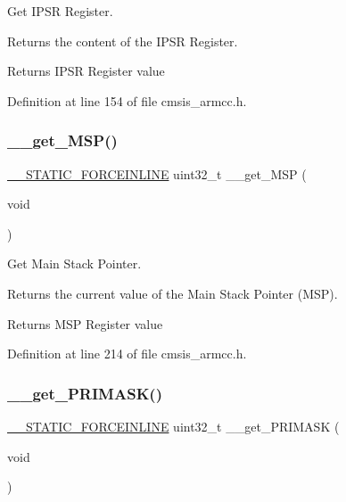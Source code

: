 Get I\+P\+SR Register. 

Returns the content of the I\+P\+SR Register. \begin{DoxyReturn}{Returns}
I\+P\+SR Register value 
\end{DoxyReturn}


Definition at line 154 of file cmsis\+\_\+armcc.\+h.

\mbox{\label{group___c_m_s_i_s___core___reg_acc_functions_ga667e7b8b97b4a30f445ae45d37588e45}} 
\subsubsection{\texorpdfstring{\+\_\+\+\_\+get\+\_\+\+M\+S\+P()}{\_\_get\_MSP()}}
{\footnotesize\ttfamily \hyperlink{cmsis__iccarm_8h_ab904513442afdf77d4f8c74f23cbb040}{\+\_\+\+\_\+\+S\+T\+A\+T\+I\+C\+\_\+\+F\+O\+R\+C\+E\+I\+N\+L\+I\+NE} uint32\+\_\+t \+\_\+\+\_\+get\+\_\+\+M\+SP (\begin{DoxyParamCaption}\item[{void}]{ }\end{DoxyParamCaption})}



Get Main Stack Pointer. 

Returns the current value of the Main Stack Pointer (M\+SP). \begin{DoxyReturn}{Returns}
M\+SP Register value 
\end{DoxyReturn}


Definition at line 214 of file cmsis\+\_\+armcc.\+h.

\mbox{\label{group___c_m_s_i_s___core___reg_acc_functions_ga4ff59fb9e280d19e79e6875863a65f0a}} 
\subsubsection{\texorpdfstring{\+\_\+\+\_\+get\+\_\+\+P\+R\+I\+M\+A\+S\+K()}{\_\_get\_PRIMASK()}}
{\footnotesize\ttfamily \hyperlink{cmsis__iccarm_8h_ab904513442afdf77d4f8c74f23cbb040}{\+\_\+\+\_\+\+S\+T\+A\+T\+I\+C\+\_\+\+F\+O\+R\+C\+E\+I\+N\+L\+I\+NE} uint32\+\_\+t \+\_\+\+\_\+get\+\_\+\+P\+R\+I\+M\+A\+SK (\begin{DoxyParamCaption}\item[{void}]{ }\end{DoxyParamCaption})}



